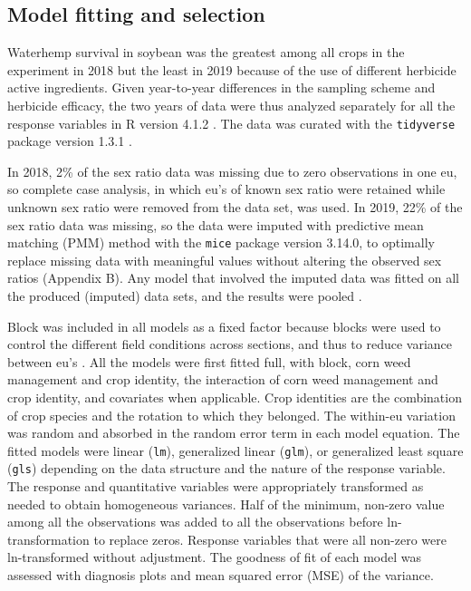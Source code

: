\documentclass[
]{article}
\begin{document}
\hypertarget{model-fitting-and-selection}{%
\subsection*{Model fitting and selection}\label{model-fitting-and-selection}}

Waterhemp survival in soybean was the greatest among all crops in the experiment in 2018 but the least in 2019 because of the use of different herbicide active ingredients. Given year-to-year differences in the sampling scheme and herbicide efficacy, the two years of data were thus analyzed separately for all the response variables in R version 4.1.2 \citep{rdevelopmentcoreteamLanguageEnvironmentStatistical2021}. The data was curated with the \texttt{tidyverse} package version 1.3.1 \citep{wickhamTidyverseEasilyInstall2021}. 

In 2018, 2\% of the sex ratio data was missing due to zero observations in one eu, so complete case analysis, in which eu's of known sex ratio were retained while unknown sex ratio were removed from the data set, was used. In 2019, 22\% of the sex ratio data was missing, so the data were imputed with predictive mean matching (PMM) method with the \texttt{mice} package version 3.14.0, \citep{vanbuurenMiceMultivariateImputation2011} to optimally replace missing data with meaningful values without altering the observed sex ratios (Appendix B). Any model that involved the imputed data was fitted on all the produced (imputed) data sets, and the results were pooled \citep{whiteMultipleImputationUsing2011}.

Block was included in all models as a fixed factor because blocks were used to control the different field conditions across sections, and thus to reduce variance between eu's \citep{dixonShouldBlocksBe2016}. All the models were first fitted full, with block, corn weed management and crop identity, the interaction of corn weed management and crop identity, and covariates when applicable. Crop identities are the combination of crop species and the rotation to which they belonged. The within-eu variation was random and absorbed in the random error term in each model equation. The fitted models were linear (\texttt{lm}), generalized linear (\texttt{glm}), or generalized least square (\texttt{gls}) depending on the data structure and the nature of the response variable. The response and quantitative variables were appropriately transformed as needed to obtain homogeneous variances. Half of the minimum, non-zero value among all the observations was added to all the observations before ln-transformation to replace zeros. Response variables that were all non-zero were ln-transformed without adjustment. The goodness of fit of each model was assessed with diagnosis plots and mean squared error (MSE) of the variance.
\end{document}
